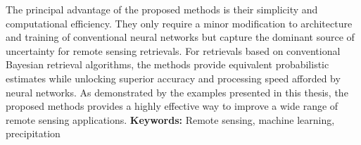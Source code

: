 The principal advantage of the proposed methods is their simplicity and
computational efficiency. They only require a minor modification to architecture
and training of conventional neural networks but capture the dominant source of
uncertainty for remote sensing retrievals. For retrievals based on conventional
Bayesian retrieval algorithms, the methods provide equivalent probabilistic
estimates while unlocking superior accuracy and processing speed afforded by
neural networks. As demonstrated by the examples presented in this thesis, the
proposed methods provides a highly effective way to improve a wide range of
remote sensing applications.
\vfill
{\textbf{Keywords:} Remote sensing, machine learning, precipitation}



